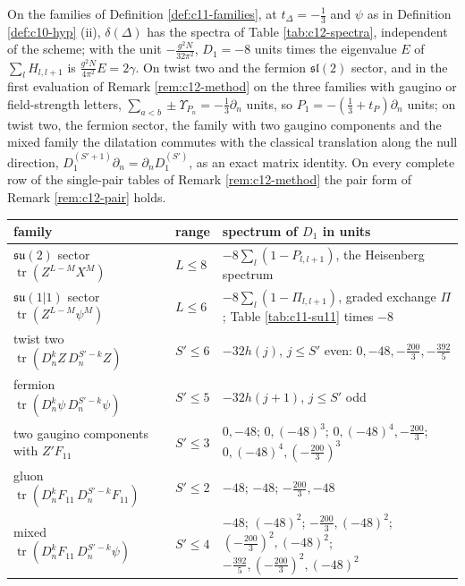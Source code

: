 \begin{proposition}
\label{prop:c12-spectra}
On the families of Definition \ref{def:c11-families}, at $t_\Delta=-\tfrac13$ and $\psi$ as in Definition \ref{def:c10-hyp} (ii), $\delta(\Delta)$ has the spectra of Table \ref{tab:c12-spectra}, independent of the scheme; with the unit $-\tfrac{g^2N}{32\pi^2}$, $D_1=-8$ units times the eigenvalue $E$ of $\sum_lH_{l,l+1}$ is $\tfrac{g^2N}{4\pi^2}E=2\gamma$. On twist two and the fermion $\mathfrak{sl}(2)$ sector, and in the first evaluation of Remark \ref{rem:c12-method} on the three families with gaugino or field-strength letters, $\sum_{a<b}\pm\Upsilon_{P_n}=-\tfrac13\partial_n$ units, so $P_1=-(\tfrac13+t_P)\partial_n$ units; on twist two, the fermion sector, the family with two gaugino components and the mixed family the dilatation commutes with the classical translation along the null direction, $D_1^{(S'+1)}\partial_n=\partial_nD_1^{(S')}$, as an exact matrix identity. On every complete row of the single-pair tables of Remark \ref{rem:c12-method} the pair form of Remark \ref{rem:c12-pair} holds.
\end{proposition}

\begin{tabular}{l|l|l}
family & range & spectrum of $D_1$ in units\\
\hline
$\mathfrak{su}(2)$ sector $\operatorname{tr}(Z^{L-M}X^M)$ & $L\le8$ & $-8\sum_l(1-P_{l,l+1})$, the Heisenberg spectrum\\
$\mathfrak{su}(1|1)$ sector $\operatorname{tr}(Z^{L-M}\psi^M)$ & $L\le6$ & $-8\sum_l(1-\Pi_{l,l+1})$, graded exchange $\Pi$; Table \ref{tab:c11-su11} times $-8$\\
twist two $\operatorname{tr}(D_n^kZ\,D_n^{S'-k}Z)$ & $S'\le6$ & $-32h(j)$, $j\le S'$ even: $0,-48,-\tfrac{200}3,-\tfrac{392}5$\\
fermion $\operatorname{tr}(D_n^k\psi\,D_n^{S'-k}\psi)$ & $S'\le5$ & $-32h(j+1)$, $j\le S'$ odd\\
two gaugino components with $Z'F_{11}$ & $S'\le3$ & $0,-48$; $0,(-48)^3$; $0,(-48)^4,-\tfrac{200}3$; $0,(-48)^4,(-\tfrac{200}3)^3$\\
gluon $\operatorname{tr}(D_n^kF_{11}\,D_n^{S'-k}F_{11})$ & $S'\le2$ & $-48$; $-48$; $-\tfrac{200}3,-48$\\
mixed $\operatorname{tr}(D_n^kF_{11}\,D_n^{S'-k}\psi)$ & $S'\le4$ & $-48$; $(-48)^2$; $-\tfrac{200}3,(-48)^2$; $(-\tfrac{200}3)^2,(-48)^2$; $-\tfrac{392}5,(-\tfrac{200}3)^2,(-48)^2$\\
\end{tabular}

